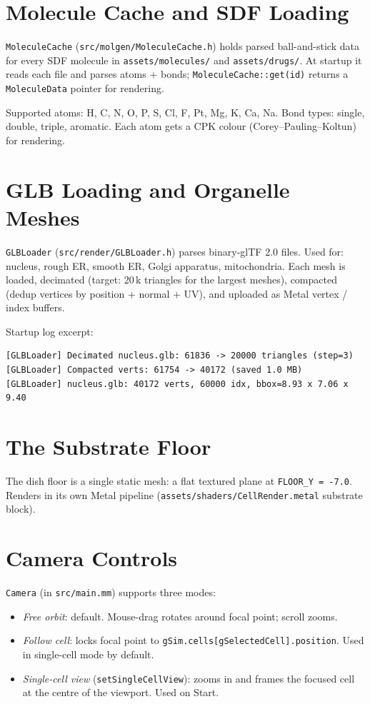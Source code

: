 \documentclass[11pt,letterpaper,twoside,openany]{book}
\newcommand{\code}[1]{\texttt{#1}}
\newcommand{\file}[1]{\texttt{\small#1}}
\begin{document}
\chapter{Molecule Cache and SDF Loading}
\label{ch:molcache}

\code{MoleculeCache} (\file{src/molgen/MoleculeCache.h}) holds parsed
ball-and-stick data for every SDF molecule in \file{assets/molecules/}
and \file{assets/drugs/}. At startup it reads each file and parses
atoms + bonds; \code{MoleculeCache::get(id)} returns a
\code{MoleculeData} pointer for rendering.

Supported atoms: H, C, N, O, P, S, Cl, F, Pt, Mg, K, Ca, Na.
Bond types: single, double, triple, aromatic. Each atom gets a
CPK colour (Corey--Pauling--Koltun) for rendering.

\chapter{GLB Loading and Organelle Meshes}
\label{ch:glbloader}

\code{GLBLoader} (\file{src/render/GLBLoader.h}) parses
binary-glTF 2.0 files. Used for: nucleus, rough ER, smooth ER,
Golgi apparatus, mitochondria. Each mesh is loaded, decimated
(target: 20\,k triangles for the largest meshes), compacted (dedup
vertices by position + normal + UV), and uploaded as Metal
vertex / index buffers.

Startup log excerpt:
\begin{verbatim}
[GLBLoader] Decimated nucleus.glb: 61836 -> 20000 triangles (step=3)
[GLBLoader] Compacted verts: 61754 -> 40172 (saved 1.0 MB)
[GLBLoader] nucleus.glb: 40172 verts, 60000 idx, bbox=8.93 x 7.06 x 9.40
\end{verbatim}

\chapter{The Substrate Floor}
\label{ch:substrate}

The dish floor is a single static mesh: a flat textured plane at
\code{FLOOR\_Y = -7.0}. Renders in its own Metal pipeline
(\file{assets/shaders/CellRender.metal} substrate block).

\chapter{Camera Controls}
\label{ch:camera}

\code{Camera} (in \file{src/main.mm}) supports three modes:
\begin{itemize}
  \item \emph{Free orbit}: default. Mouse-drag rotates around focal
        point; scroll zooms.
  \item \emph{Follow cell}: locks focal point to
        \code{gSim.cells[gSelectedCell].position}. Used in
        single-cell mode by default.
  \item \emph{Single-cell view} (\code{setSingleCellView}): zooms
        in and frames the focused cell at the centre of the
        viewport. Used on Start.
\end{itemize}
\end{document}
